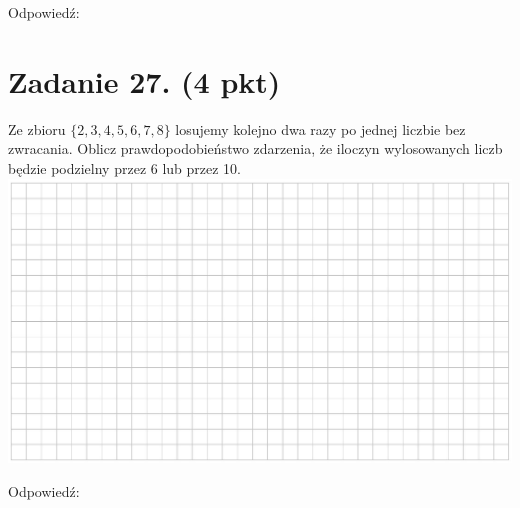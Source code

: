 \documentclass[10pt]{article}
\begin{document}
Odpowiedź: \(\qquad\)

\section*{Zadanie 27. (4 pkt)}
Ze zbioru \(\{2,3,4,5,6,7,8\}\) losujemy kolejno dwa razy po jednej liczbie bez zwracania. Oblicz prawdopodobieństwo zdarzenia, że iloczyn wylosowanych liczb będzie podzielny przez 6 lub przez 10.\\
\includegraphics[max width=\textwidth, center]{2024_11_21_6438f6dbc3784fe6d1deg-11}

Odpowiedź: \(\qquad\)
\end{document}
